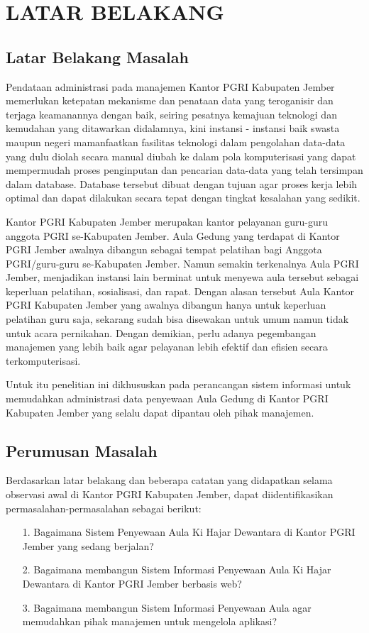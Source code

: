 \documentclass{jtetiproposalskripsi}
\begin{document}
\chapter{LATAR BELAKANG}

\section{Latar Belakang Masalah}
Pendataan administrasi pada manajemen Kantor PGRI Kabupaten Jember memerlukan ketepatan mekanisme dan penataan data yang teroganisir dan terjaga keamanannya dengan baik, seiring pesatnya kemajuan teknologi dan kemudahan yang ditawarkan didalamnya, kini instansi - instansi baik swasta maupun negeri mamanfaatkan fasilitas teknologi dalam pengolahan data-data yang dulu diolah secara manual diubah ke dalam pola komputerisasi yang dapat mempermudah proses penginputan dan pencarian data-data yang telah tersimpan dalam database. Database tersebut dibuat dengan tujuan agar proses kerja lebih optimal dan dapat dilakukan secara tepat dengan tingkat kesalahan yang sedikit.

Kantor PGRI Kabupaten Jember merupakan kantor pelayanan guru-guru anggota PGRI se-Kabupaten Jember. Aula Gedung yang terdapat di Kantor PGRI Jember awalnya dibangun sebagai tempat pelatihan bagi Anggota PGRI/guru-guru se-Kabupaten Jember. Namun semakin terkenalnya Aula PGRI Jember, menjadikan instansi lain berminat untuk menyewa aula tersebut sebagai keperluan pelatihan, sosialisasi, dan rapat. Dengan alasan tersebut Aula Kantor PGRI Kabupaten Jember yang awalnya dibangun hanya untuk keperluan pelatihan guru saja, sekarang sudah bisa disewakan untuk umum namun tidak untuk acara pernikahan. Dengan demikian, perlu adanya pegembangan manajemen yang lebih baik agar pelayanan lebih efektif dan efisien secara terkomputerisasi.

Untuk itu penelitian ini dikhususkan pada perancangan sistem informasi untuk memudahkan administrasi data penyewaan Aula Gedung di Kantor PGRI Kabupaten Jember yang selalu dapat dipantau oleh pihak manajemen.

\section{Perumusan Masalah}
Berdasarkan latar belakang dan beberapa catatan yang didapatkan selama observasi awal di Kantor PGRI Kabupaten Jember, dapat diidentifikasikan permasalahan-permasalahan sebagai berikut:	 
\begin{itemize}
\item[1.] Bagaimana Sistem Penyewaan Aula Ki Hajar Dewantara di Kantor PGRI Jember yang sedang berjalan?
\item[2.] Bagaimana membangun Sistem Informasi Penyewaan Aula Ki Hajar Dewantara di Kantor PGRI Jember berbasis web?
\item[3.] Bagaimana membangun Sistem Informasi Penyewaan Aula agar memudahkan pihak manajemen untuk mengelola aplikasi?
\end{itemize}
\end{document}
